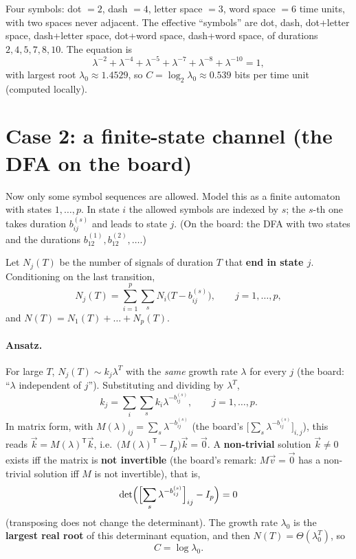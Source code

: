 \documentclass[11pt]{article}
\begin{document}
\begin{example}
Four symbols: dot $=2$, dash $=4$, letter space $=3$, word space $=6$ time units, with two spaces never adjacent. The effective ``symbols'' are dot, dash, dot+letter space, dash+letter space, dot+word space, dash+word space, of durations $2,4,5,7,8,10$. The equation is
\[
\lambda^{-2}+\lambda^{-4}+\lambda^{-5}+\lambda^{-7}+\lambda^{-8}+\lambda^{-10}=1,
\]
with largest root $\lambda_0\approx1.4529$, so $C=\log_2\lambda_0\approx0.539$ bits per time unit (computed locally).
\end{example}

\section*{Case 2: a finite-state channel (the DFA on the board)}

Now only some symbol sequences are allowed. Model this as a finite automaton with states $1,\dots,p$. In state $i$ the allowed symbols are indexed by $s$; the $s$-th one takes duration $b_{ij}^{(s)}$ and leads to state $j$. (On the board: the DFA with two states and the durations $b_{12}^{(1)},b_{12}^{(2)},\dots$.)

Let $N_j(T)$ be the number of signals of duration $T$ that \textbf{end in state $j$}. Conditioning on the last transition,
\[
N_j(T)=\sum_{i=1}^p\sum_sN_i\bigl(T-b_{ij}^{(s)}\bigr),\qquad j=1,\dots,p,
\]
and $N(T)=N_1(T)+\dots+N_p(T)$.

\paragraph{Ansatz.} For large $T$, $N_j(T)\sim k_j\lambda^T$ with the \emph{same} growth rate $\lambda$ for every $j$ (the board: ``$\lambda$ independent of $j$''). Substituting and dividing by $\lambda^T$,
\[
k_j=\sum_i\sum_sk_i\lambda^{-b_{ij}^{(s)}},\qquad j=1,\dots,p.
\]
In matrix form, with $M(\lambda)_{ij}=\sum_s\lambda^{-b_{ij}^{(s)}}$ (the board's $\bigl[\sum_s\lambda^{-b^{(s)}_{ij}}\bigr]_{i,j}$), this reads $\vec k=M(\lambda)^{\mathsf T}\vec k$, i.e.\ $\bigl(M(\lambda)^{\mathsf T}-I_p\bigr)\vec k=\vec0$. A \textbf{non-trivial} solution $\vec k\ne0$ exists iff the matrix is \textbf{not invertible} (the board's remark: $M\vec v=\vec0$ has a non-trivial solution iff $M$ is not invertible), that is,
\[
\det\Bigl(\Bigl[\sum_s\lambda^{-b_{ij}^{(s)}}\Bigr]_{ij}-I_p\Bigr)=0
\]
(transposing does not change the determinant). The growth rate $\lambda_0$ is the \textbf{largest real root} of this determinant equation, and then $N(T)=\Theta(\lambda_0^T)$, so
\[
\boxed{C=\log\lambda_0}.
\]
\end{document}
